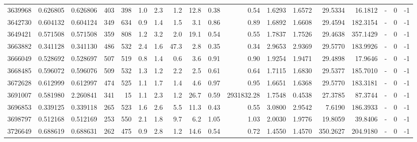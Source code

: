 \begin{tabular}{rrrrrrrrrrrrrrrlrr}
   3639968 & 0.626805 &   0.626806 &  403 &  398 &      1.0 &      2.3 &     1.2 &     12.8 &       0.38 &        0.54 &  1.6293 &  1.6572 &   29.5334 &   16.1812 &             - &        0 &         -1 \\
   3642730 & 0.604132 &   0.604124 &  349 &  634 &      0.9 &      1.4 &     1.5 &      3.1 &       0.86 &        0.89 &  1.6892 &  1.6608 &   29.4594 &  182.3154 &             - &        0 &         -1 \\
   3649421 & 0.571508 &   0.571508 &  359 &  808 &      1.2 &      3.2 &     2.0 &     19.1 &       0.54 &        0.55 &  1.7837 &  1.7526 &   29.4638 &  357.1429 &             - &        0 &         -1 \\
   3663882 & 0.341128 &   0.341130 &  486 &  532 &      2.4 &      1.6 &    47.3 &      2.8 &       0.35 &        0.34 &  2.9653 &  2.9369 &   29.5770 &  183.9926 &             - &        0 &         -1 \\
   3666049 & 0.528692 &   0.528697 &  507 &  519 &      0.8 &      1.4 &     0.6 &      3.6 &       0.91 &        0.90 &  1.9254 &  1.9471 &   29.4898 &   17.9646 &             - &        0 &         -1 \\
   3668485 & 0.596072 &   0.596076 &  509 &  532 &      1.3 &      1.2 &     2.2 &      2.5 &       0.61 &        0.64 &  1.7115 &  1.6830 &   29.5377 &  185.7010 &             - &        0 &         -1 \\
   3672628 & 0.612999 &   0.612997 &  474 &  525 &      1.1 &      1.7 &     1.4 &      4.6 &       0.97 &        0.95 &  1.6651 &  1.6368 &   29.5770 &  183.3181 &             - &        0 &         -1 \\
   3691007 & 0.581980 &   2.260841 &  341 &   15 &      1.1 &      2.3 &     1.2 &     26.7 &       0.59 &  2931832.28 &  1.7548 &  0.4538 &   27.3785 &   87.3744 &             - &        0 &         -1 \\
   3696853 & 0.339125 &   0.339118 &  265 &  523 &      1.6 &      2.6 &     5.5 &     11.3 &       0.43 &        0.55 &  3.0800 &  2.9542 &    7.6190 &  186.3933 &             - &        0 &         -1 \\
   3698797 & 0.512168 &   0.512169 &  253 &  550 &      2.1 &      1.8 &     9.7 &      6.2 &       1.05 &        1.03 &  2.0030 &  1.9776 &   19.8059 &   39.8406 &             - &        0 &         -1 \\
   3726649 & 0.688619 &   0.688631 &  262 &  475 &      0.9 &      2.8 &     1.2 &     14.6 &       0.54 &        0.72 &  1.4550 &  1.4570 &  350.2627 &  204.9180 &             - &        0 &         -1 \\

\end{tabular}
